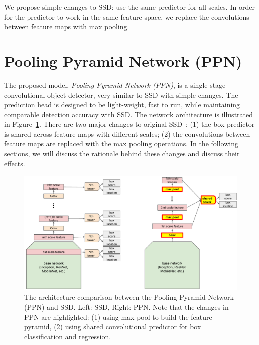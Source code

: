 \documentclass[10pt,twocolumn,letterpaper]{article}
\begin{document}
We propose simple changes to SSD: use the same predictor
for all scales. In order for the predictor to work in the
same feature space, we replace the convolutions between
feature maps with max pooling.










\section{Pooling Pyramid Network (PPN)}
The proposed model, \textit{Pooling Pyramid Network (PPN)},
is a single-stage convolutional object detector, very
similar to SSD with simple changes.  The prediction head is
designed to be light-weight, fast to run, while maintaining
comparable detection accuracy with SSD.
The network architecture is illustrated in
Figure~\ref{fig:ppn}.  There are two major changes to
original SSD~\cite{liu2016ssd}: (1) the box predictor is
shared across feature maps with different scales; (2) the
convolutions between feature maps are replaced with the max
pooling operations.  In the following sections, we will
discuss the rationale behind these changes and discuss their effects.

\begin{figure}[t]
\begin{center}
\includegraphics[width=1.0\linewidth]{figure/ppn_vs_ssd.pdf}
\end{center}
\caption{
The architecture comparison between the Pooling Pyramid Network (PPN)
and SSD. Left: SSD, Right: PPN.
Note that the changes in PPN are highlighted:
(1) using max pool to build the feature pyramid,
(2) using shared convolutional predictor for box classification and regression.
}
\label{fig:ppn}
\end{figure}
\end{document}
